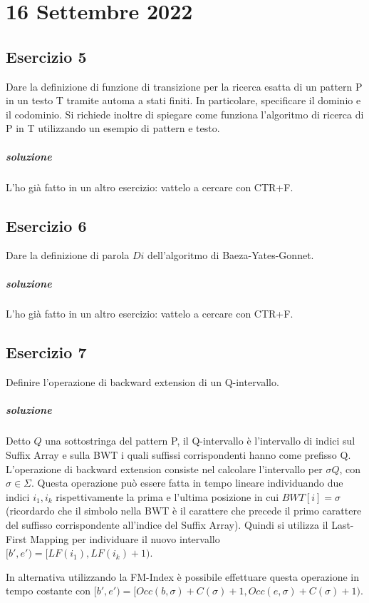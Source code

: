 \chapter{16 Settembre 2022}

\section{Esercizio 5}

Dare la definizione di funzione di transizione per la ricerca esatta di un pattern P in un testo T tramite automa a stati finiti. In particolare, specificare il dominio e il codominio.
Si richiede inoltre di spiegare come funziona l'algoritmo di ricerca di P in T utilizzando un esempio di pattern e testo.

\paragraph{soluzione} L'ho gi\`a fatto in un altro esercizio: vattelo a cercare con CTR+F.

\section{Esercizio 6}

Dare la definizione di parola $Di$ dell'algoritmo di Baeza-Yates-Gonnet.

\paragraph{soluzione} L'ho gi\`a fatto in un altro esercizio: vattelo a cercare con CTR+F.

\section{Esercizio 7}

Definire l'operazione di backward extension di un Q-intervallo.

\paragraph{soluzione}

Detto $Q$ una sottostringa del pattern P, il Q-intervallo \`e l'intervallo di indici sul Suffix Array e sulla BWT i quali suffissi corrispondenti hanno come prefisso Q. L'operazione di backward extension consiste nel calcolare l'intervallo per $\sigma Q$, con $\sigma \in \Sigma$.
Questa operazione pu\`o essere fatta in tempo lineare individuando due indici $i_1, i_k$ rispettivamente la prima e l'ultima posizione in cui $BWT[i] = \sigma$ (ricordardo che il simbolo nella BWT \`e il carattere che precede il primo carattere del suffisso corrispondente all'indice del Suffix Array).
Quindi si utilizza il Last-First Mapping per individuare il nuovo intervallo $[b', e') = [LF(i_1), LF(i_k)+1)$.

In alternativa utilizzando la FM-Index \`e possibile effettuare questa operazione in tempo costante con $[b', e') = [Occ(b, \sigma) + C(\sigma) + 1, Occ(e, \sigma) + C(\sigma) + 1)$.
